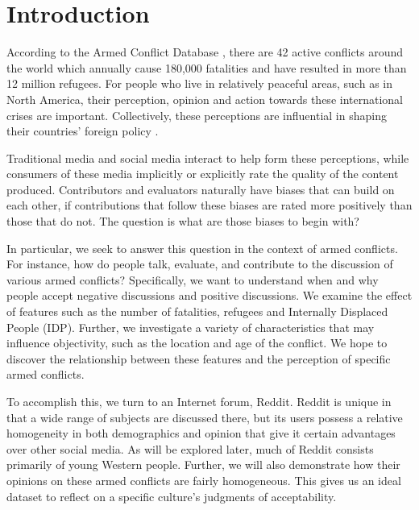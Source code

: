 \section{Introduction}
According to the Armed Conflict Database \cite{conflictDB}, there are 42 active conflicts around the world which annually cause 180,000 fatalities and have resulted in more than 12 million refugees. For people who live in relatively peaceful areas, such as in North America, their perception, opinion and action towards these international crises are important. Collectively, these perceptions are influential in shaping their countries' foreign policy \cite{Gelpi2009}. 

Traditional media and social media interact to help form these perceptions, while consumers of these media implicitly or explicitly rate the quality of the content produced. Contributors and evaluators naturally have biases that can build on each other, if contributions that follow these biases are rated more positively than those that do not. The question is what are those biases to begin with?

In particular, we seek to answer this question in the context of armed conflicts. For instance, how do people talk, evaluate, and contribute to the discussion of various armed conflicts? Specifically, we want to understand when and why people accept negative discussions and positive discussions. We examine the effect of features such as the number of fatalities, refugees and Internally Displaced People (IDP). Further, we investigate a variety of characteristics that may influence objectivity, such as the location and age of the conflict. We hope to discover the relationship between these features and the perception of specific armed conflicts.

To accomplish this, we turn to an Internet forum, Reddit. Reddit is unique in that a wide range of subjects are discussed there, but its users possess a relative homogeneity in both demographics and opinion that give it certain advantages over other social media. As will be explored later, much of Reddit consists primarily of young Western people. Further, we will also demonstrate how their opinions on these armed conflicts are fairly homogeneous. This gives us an ideal dataset to reflect on a specific culture's judgments of acceptability.

